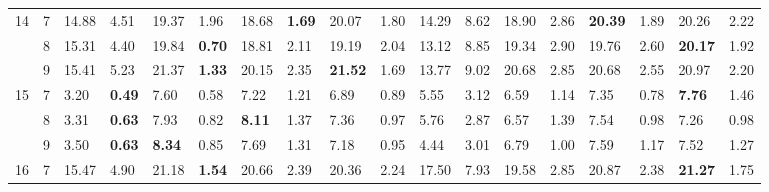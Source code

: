 \documentclass[conference]{IEEEtran}
\begin{document}
\begin{table}[]
\begin{tabular}{|cl|ll|ll|ll|ll|ll|ll|ll|ll|}
		\multicolumn{1}{|c|}{\multirow{3}{*}{14}} & 7 & \multicolumn{1}{l|}{14.88} & 4.51 & \multicolumn{1}{l|}{19.37} & 1.96 & \multicolumn{1}{l|}{18.68} & \textbf{1.69} & \multicolumn{1}{l|}{20.07} & 1.80 & \multicolumn{1}{l|}{14.29} & 8.62 & \multicolumn{1}{l|}{18.90} & 2.86 & \multicolumn{1}{l|}{\textbf{20.39}} & 1.89 & \multicolumn{1}{l|}{20.26} & 2.22 \\ \cline{2-18} 
		\multicolumn{1}{|c|}{} & 8 & \multicolumn{1}{l|}{15.31} & 4.40 & \multicolumn{1}{l|}{19.84} & \textbf{0.70} & \multicolumn{1}{l|}{18.81} & 2.11 & \multicolumn{1}{l|}{19.19} & 2.04 & \multicolumn{1}{l|}{13.12} & 8.85 & \multicolumn{1}{l|}{19.34} & 2.90 & \multicolumn{1}{l|}{19.76} & 2.60 & \multicolumn{1}{l|}{\textbf{20.17}} & 1.92 \\ \cline{2-18} 
		\multicolumn{1}{|c|}{} & 9 & \multicolumn{1}{l|}{15.41} & 5.23 & \multicolumn{1}{l|}{21.37} & \textbf{1.33} & \multicolumn{1}{l|}{20.15} & 2.35 & \multicolumn{1}{l|}{\textbf{21.52}} & 1.69 & \multicolumn{1}{l|}{13.77} & 9.02 & \multicolumn{1}{l|}{20.68} & 2.85 & \multicolumn{1}{l|}{20.68} & 2.55 & \multicolumn{1}{l|}{20.97} & 2.20 \\ \hline
		\multicolumn{1}{|c|}{\multirow{3}{*}{15}} & 7 & \multicolumn{1}{l|}{3.20} & \textbf{0.49} & \multicolumn{1}{l|}{7.60} & 0.58 & \multicolumn{1}{l|}{7.22} & 1.21 & \multicolumn{1}{l|}{6.89} & 0.89 & \multicolumn{1}{l|}{5.55} & 3.12 & \multicolumn{1}{l|}{6.59} & 1.14 & \multicolumn{1}{l|}{7.35} & 0.78 & \multicolumn{1}{l|}{\textbf{7.76}} & 1.46 \\ \cline{2-18} 
		\multicolumn{1}{|c|}{} & 8 & \multicolumn{1}{l|}{3.31} & \textbf{0.63} & \multicolumn{1}{l|}{7.93} & 0.82 & \multicolumn{1}{l|}{\textbf{8.11}} & 1.37 & \multicolumn{1}{l|}{7.36} & 0.97 & \multicolumn{1}{l|}{5.76} & 2.87 & \multicolumn{1}{l|}{6.57} & 1.39 & \multicolumn{1}{l|}{7.54} & 0.98 & \multicolumn{1}{l|}{7.26} & 0.98 \\ \cline{2-18} 
		\multicolumn{1}{|c|}{} & 9 & \multicolumn{1}{l|}{3.50} & \textbf{0.63} & \multicolumn{1}{l|}{\textbf{8.34}} & 0.85 & \multicolumn{1}{l|}{7.69} & 1.31 & \multicolumn{1}{l|}{7.18} & 0.95 & \multicolumn{1}{l|}{4.44} & 3.01 & \multicolumn{1}{l|}{6.79} & 1.00 & \multicolumn{1}{l|}{7.59} & 1.17 & \multicolumn{1}{l|}{7.52} & 1.27 \\ \hline
		\multicolumn{1}{|c|}{\multirow{3}{*}{16}} & 7 & \multicolumn{1}{l|}{15.47} & 4.90 & \multicolumn{1}{l|}{21.18} & \textbf{1.54} & \multicolumn{1}{l|}{20.66} & 2.39 & \multicolumn{1}{l|}{20.36} & 2.24 & \multicolumn{1}{l|}{17.50} & 7.93 & \multicolumn{1}{l|}{19.58} & 2.85 & \multicolumn{1}{l|}{20.87} & 2.38 & \multicolumn{1}{l|}{\textbf{21.27}} & 1.75 \\ \cline{2-18} 

\end{tabular}
\end{table}
\end{document}
